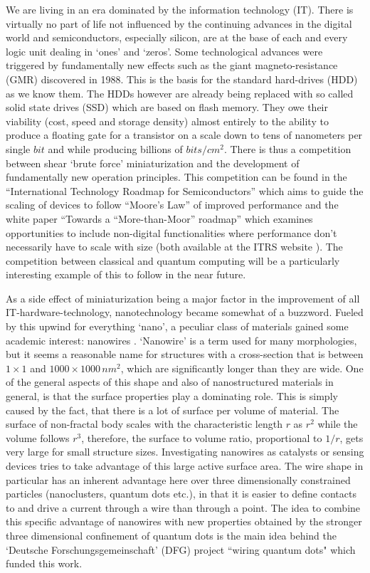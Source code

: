 
We are living in an era dominated by the information technology (IT). There is virtually no part of life not influenced by the continuing advances in the digital world and semiconductors, especially silicon, are at the base of each and every logic unit dealing in `ones' and `zeros'. Some technological advances were triggered by fundamentally new effects such as the giant magneto-resistance (GMR) discovered in 1988. This is the basis for the standard hard-drives (HDD) as we know them. The HDDs however are already being replaced with so called solid state drives (SSD) which are based on flash memory. They owe their viability (cost, speed and storage density) almost entirely to the ability to produce a floating gate for a transistor on a scale down to tens of nanometers per single $bit$ and while producing billions of $bits/cm^{2}$. There is thus a competition between shear `brute force' miniaturization and the development of fundamentally new operation principles. This competition can be found in the ``International Technology Roadmap for Semiconductors'' which aims to guide the scaling of devices to follow ``Moore's Law'' of improved performance and the white paper ``Towards a ``More-than-Moor'' roadmap'' which examines opportunities to include non-digital functionalities where performance don't necessarily have to scale with size (both available at the ITRS website  \cite{itrs_road_map_itrs_2015}). The competition between classical and quantum computing will be a particularly interesting example of this to follow in the near future.

As a side effect of miniaturization being a major factor in the improvement of all IT-hardware-technology, nanotechnology became somewhat of a buzzword. Fueled by this upwind for everything `nano', a peculiar class of materials gained some academic interest: nanowires \cite{xia_one-dimensional_2003,lieber_functional_2007}. `Nanowire' is a term used for many morphologies, but it seems a reasonable name for structures with a cross-section that is between $1\times1$ and $1000\times1000\,nm^2$, which are significantly longer than they are wide. One of the general aspects of this shape and also of nanostructured materials in general, is that the surface properties play a dominating role. This is simply caused by the fact, that there is a lot of surface per volume of material. The surface of non-fractal body scales with the characteristic length $r$ as $r^2$ while the volume follows $r^3$, therefore, the surface to volume ratio, proportional to $1/r$, gets very large for small structure sizes. Investigating nanowires as catalysts or sensing devices tries to take advantage of this large active surface area. The wire shape in particular has an inherent advantage here over three dimensionally constrained particles (nanoclusters, quantum dots etc.), in that it is easier to define contacts to and drive a current through a wire than through a point. The idea to combine this specific advantage of nanowires with new properties obtained by the stronger three dimensional confinement of quantum dots is the main idea behind the `Deutsche Forschungsgemeinschaft' (DFG) project ``wiring quantum dots" which funded this work. 

